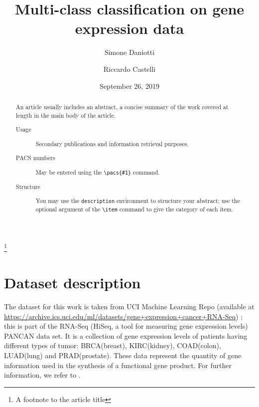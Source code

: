 \documentclass[%
 reprint,
 amsmath,amssymb,
 aps,
]{revtex4-1}
\begin{document}


\title{Multi-class classification on gene expression data}%
\thanks{A footnote to the article title}%

\author{Simone Daniotti}

\author{Riccardo Castelli}
%



\date{September 26, 2019}%

\begin{abstract}
An article usually includes an abstract, a concise summary of the work
covered at length in the main body of the article. 
\begin{description}
\item[Usage]
Secondary publications and information retrieval purposes.
\item[PACS numbers]
May be entered using the \verb+\pacs{#1}+ command.
\item[Structure]
You may use the \texttt{description} environment to structure your abstract;
use the optional argument of the \verb+\item+ command to give the category of each item. 
\end{description}
\end{abstract}

\maketitle

\tableofcontents

\section{\label{sec:level1}Dataset description}

The dataset for this work is taken from UCI Machine Learning Repo (available at \url{https://archive.ics.uci.edu/ml/datasets/gene+expression+cancer+RNA-Seq}) \cite{Dua:2019}; this is part of the RNA-Seq (HiSeq, a tool for measuring gene expression levels) PANCAN data set. It is a collection of gene expression levels of patients having different types of tumor: BRCA(breast), KIRC(kidney), COAD(colon), LUAD(lung) and PRAD(prostate).
These data represent the quantity of gene information used in the synthesis of a functional gene product. For further information, we refer to \cite{weinstein2013cancer}.
\end{document}
